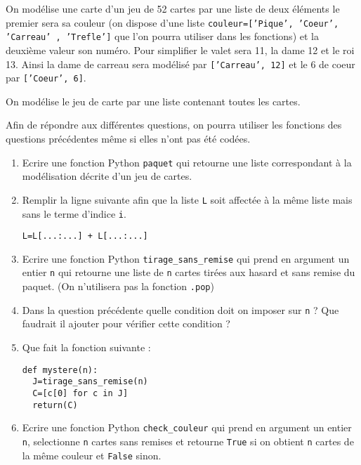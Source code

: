 \documentclass[a4paper, 11pt,reqno]{article}
\begin{document}
\begin{exercice}

On modélise une carte d'un jeu de 52 cartes par une liste de deux éléments le premier sera sa couleur (on dispose d'une liste \texttt{couleur=['Pique', 'Coeur', 'Carreau' , 'Trefle']}  que l'on pourra utiliser dans les fonctions) et la deuxième valeur son numéro. Pour simplifier le valet sera 11, la dame 12 et le roi 13. Ainsi la dame de carreau sera modélisé par \texttt{['Carreau', 12]} et le 6 de coeur par  \texttt{['Coeur', 6]}.

On modélise le jeu de carte par une liste contenant toutes les cartes. 

Afin de répondre aux différentes questions, on pourra utiliser les fonctions des questions précédentes même si elles n'ont pas été codées.

\begin{enumerate}
\item Ecrire une fonction Python \texttt{paquet} qui retourne une liste correspondant à la modélisation décrite d'un jeu de cartes. 
\item 
Remplir la ligne suivante afin que la liste \texttt{L} soit affectée à la même liste mais sans le terme d'indice \texttt{i}. \begin{lstlisting} 
L=L[...:...] + L[...:...] 
\end{lstlisting}
\item Ecrire une fonction Python  \texttt{tirage\_sans\_remise}  qui prend en argument un entier \texttt{n} qui retourne une liste de  \texttt{n} cartes tirées aux hasard et sans remise du paquet. (On n'utilisera pas la fonction \texttt{.pop})
\item Dans la question précédente quelle condition doit on imposer sur \texttt{n} ? Que faudrait il ajouter pour vérifier cette condition ?  
\item Que fait la fonction suivante : 
\begin{lstlisting}
def mystere(n):
  J=tirage_sans_remise(n)
  C=[c[0] for c in J]
  return(C)
\end{lstlisting}

\item Ecrire une fonction Python  \texttt{check\_couleur}  qui prend en argument un entier \texttt{n}, selectionne \texttt{n} cartes sans remises  et retourne \texttt{True} si on obtient \texttt{n}   cartes de la même couleur et \texttt{False} sinon.


\end{enumerate}
\end{exercice}
\end{document}

